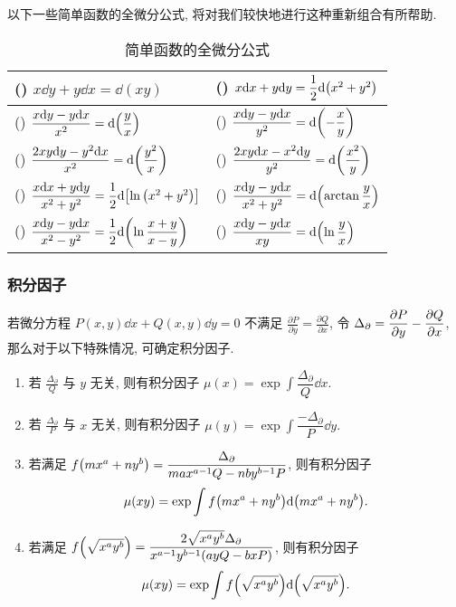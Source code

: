 以下一些简单函数的全微分公式, 将对我们较快地进行这种重新组合有所帮助.
\setcounter{magicrownumbers}{0}
\begin{table}[H]
    \centering
    \caption{简单函数的全微分公式}
    \begin{tabular}{l l}
        (\rownumber{}) $x\dd y+y\dd x=\dd (xy)$                                                   & (\rownumber{}) $x\dd x+y\dd y=\dfrac{1}{2}\dd \qty(x^2+y^2)$                 \\
        \midrule
        (\rownumber{}) $\dfrac{x\dd y-y\dd x}{x^2}=\dd \qty(\dfrac{y}{x})$                        & (\rownumber{}) $\dfrac{x\dd y-y\dd x}{y^2}=\dd \qty(-\dfrac{x}{y})$          \\
        (\rownumber{}) $\dfrac{2xy\dd y-y^2\dd x}{x^2}=\dd\qty(\dfrac{y^2}{x})$                   & (\rownumber{}) $\dfrac{2xy\dd x-x^2\dd y}{y^2}=\dd \qty(\dfrac{x^2}{y})$     \\
        \midrule
        (\rownumber{}) $\dfrac{x\dd x+y\dd y}{x^2+y^2}=\dfrac{1}{2}\dd \qty[\ln\qty(x^2+y^2)]$    & (\rownumber{}) $\dfrac{x\dd y-y\dd x}{x^2+y^2}=\dd\qty(\arctan\dfrac{y}{x})$ \\
        (\rownumber{}) $\dfrac{x\dd y-y\dd x}{x^2-y^2}=\dfrac{1}{2}\dd \qty(\ln\dfrac{x+y}{x-y})$ & (\rownumber{}) $\dfrac{x\dd y-y\dd x}{xy}=\dd \qty(\ln\dfrac{y}{x})$         \\
    \end{tabular}
\end{table}

\subsubsection{积分因子}

\begin{theorem}[积分因子]
    若微分方程 $P(x,y)\dd x+Q(x,y)\dd y=0$ 不满足 $\displaystyle\frac{\partial P}{\partial y}=\frac{\partial Q}{\partial x}$,
    令 $\Delta _\partial=\displaystyle\pdv{P}{y}-\pdv{Q}{x}$, 那么对于以下特殊情况, 可确定积分因子.
    \begin{enumerate}[label=(\arabic{*})]
        \item 若 $\displaystyle\frac{\Delta _\partial}{Q}$ 与 $y$ 无关, 则有积分因子 $\displaystyle\mu(x)=\exp\int\dfrac{\Delta_\partial}{Q}\dd x.$
        \item 若 $\displaystyle\frac{\Delta _\partial}{P}$ 与 $x$ 无关, 则有积分因子 $\displaystyle\mu(y)=\exp\int\dfrac{-\Delta_\partial}{P}\dd y.$
        \item 若满足 $f\qty(mx^a+ny^b)=\dfrac{\Delta _\partial}{max^{a-1}Q-nby^{b-1}P}$, 则有积分因子 $$\mu(xy)=\exp\int f\qty(mx^a+ny^b)\dd \qty(mx^a+ny^b).$$
        \item 若满足 $f\qty(\sqrt{x^ay^b})=\dfrac{2\sqrt{x^ay^b}\Delta_\partial}{x^{a-1}y^{b-1}(ayQ-bxP)}$, 则有积分因子
              $$\mu(xy)=\exp\int f\qty(\sqrt{x^ay^b})\dd \qty(\sqrt{x^ay^b}).$$
    \end{enumerate}
\end{theorem}


